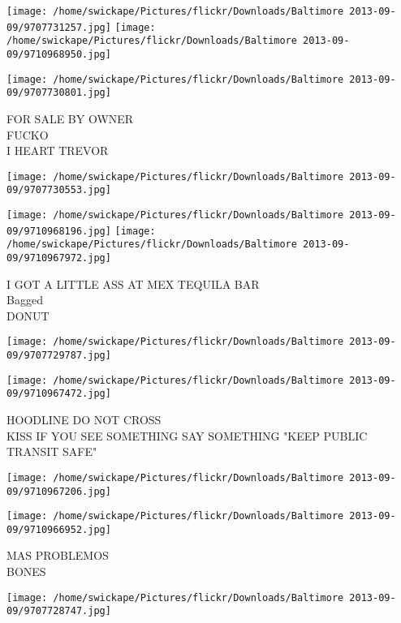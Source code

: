 \documentclass[10pt,letterpaper]{article}
\begin{document}
\texttt{[image: /home/swickape/Pictures/flickr/Downloads/Baltimore 2013-09-09/9707731257.jpg]}
\texttt{[image: /home/swickape/Pictures/flickr/Downloads/Baltimore 2013-09-09/9710968950.jpg]}

\texttt{[image: /home/swickape/Pictures/flickr/Downloads/Baltimore 2013-09-09/9707730801.jpg]}

FOR SALE BY OWNER\\
FUCKO\\
I HEART TREVOR\\
\pagebreak

\texttt{[image: /home/swickape/Pictures/flickr/Downloads/Baltimore 2013-09-09/9707730553.jpg]}

\vspace{0.25in}
\texttt{[image: /home/swickape/Pictures/flickr/Downloads/Baltimore 2013-09-09/9710968196.jpg]}
\texttt{[image: /home/swickape/Pictures/flickr/Downloads/Baltimore 2013-09-09/9710967972.jpg]}

I GOT A LITTLE ASS AT MEX TEQUILA BAR\\
Bagged\\
DONUT\\
\pagebreak

\texttt{[image: /home/swickape/Pictures/flickr/Downloads/Baltimore 2013-09-09/9707729787.jpg]}

\vspace{0.25in}
\texttt{[image: /home/swickape/Pictures/flickr/Downloads/Baltimore 2013-09-09/9710967472.jpg]}

HOODLINE DO NOT CROSS\\
KISS IF YOU SEE SOMETHING SAY SOMETHING "KEEP PUBLIC TRANSIT SAFE"\\
\pagebreak

\texttt{[image: /home/swickape/Pictures/flickr/Downloads/Baltimore 2013-09-09/9710967206.jpg]}

\vspace{0.25in}
\texttt{[image: /home/swickape/Pictures/flickr/Downloads/Baltimore 2013-09-09/9710966952.jpg]}

MAS PROBLEMOS\\
BONES\\
\pagebreak

\texttt{[image: /home/swickape/Pictures/flickr/Downloads/Baltimore 2013-09-09/9707728747.jpg]}
\end{document}

